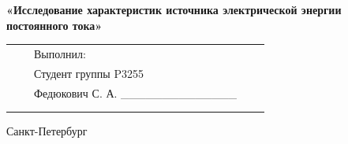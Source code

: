 \documentclass[12pt]{article}
\begin{document}
\begin{center}
		\large
		\par\bigskip
		\textbf{«Исследование характеристик источника электрической энергии постоянного тока»}
		\par\bigskip\par\bigskip\par\bigskip\par\bigskip\par\bigskip\par\bigskip
		\par\bigskip\par\bigskip\par\bigskip\par\bigskip\par\bigskip\par\bigskip
		\par\bigskip\par\bigskip\par\bigskip\par\bigskip\par\bigskip\par\bigskip
		\normalsize
		\begin{tabular}{lllll}
							\hspace{170pt}	 							& \hspace{80pt}	&	Выполнил:								&\\
																	&			&	Студент группы P3255					&\\
																	& 			&	Федюкович С. А. \_\_\_\_\_\_\_\_\_\_\_\_\_\_	&\\
																	&			&										&\\
																	&			&										&\\
		\end{tabular}
		\par\bigskip\par\bigskip\par\bigskip                                                  
		\par\bigskip \par\bigskip
		\par\bigskip\par\bigskip\par\bigskip\par\bigskip\par\bigskip\par\bigskip\par\bigskip\par\bigskip
		
		Санкт-Петербург
		\par{}
	\end{center}
	\newpage
	\pagestyle{plain}
	\setcounter{page}{1}
\end{document}
